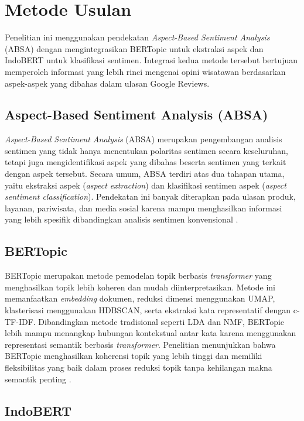 \section{Metode Usulan}

Penelitian ini menggunakan pendekatan \textit{Aspect-Based Sentiment Analysis} (ABSA) dengan mengintegrasikan BERTopic untuk ekstraksi aspek dan IndoBERT untuk klasifikasi sentimen. Integrasi kedua metode tersebut bertujuan memperoleh informasi yang lebih rinci mengenai opini wisatawan berdasarkan aspek-aspek yang dibahas dalam ulasan Google Reviews.

\subsection{Aspect-Based Sentiment Analysis (ABSA)}

\textit{Aspect-Based Sentiment Analysis} (ABSA) merupakan pengembangan analisis sentimen yang tidak hanya menentukan polaritas sentimen secara keseluruhan, tetapi juga mengidentifikasi aspek yang dibahas beserta sentimen yang terkait dengan aspek tersebut. Secara umum, ABSA terdiri atas dua tahapan utama, yaitu ekstraksi aspek (\textit{aspect extraction}) dan klasifikasi sentimen aspek (\textit{aspect sentiment classification}). Pendekatan ini banyak diterapkan pada ulasan produk, layanan, pariwisata, dan media sosial karena mampu menghasilkan informasi yang lebih spesifik dibandingkan analisis sentimen konvensional \parencite{yulianti2023,sejati2024}.

\subsection{BERTopic}

BERTopic merupakan metode pemodelan topik berbasis \textit{transformer} yang menghasilkan topik lebih koheren dan mudah diinterpretasikan. Metode ini memanfaatkan \textit{embedding} dokumen, reduksi dimensi menggunakan UMAP, klasterisasi menggunakan HDBSCAN, serta ekstraksi kata representatif dengan c-TF-IDF. Dibandingkan metode tradisional seperti LDA dan NMF, BERTopic lebih mampu menangkap hubungan kontekstual antar kata karena menggunakan representasi semantik berbasis \textit{transformer}. Penelitian menunjukkan bahwa BERTopic menghasilkan koherensi topik yang lebih tinggi dan memiliki fleksibilitas yang baik dalam proses reduksi topik tanpa kehilangan makna semantik penting \parencite{babalola2023,janssens2025}.

\subsection{IndoBERT}

